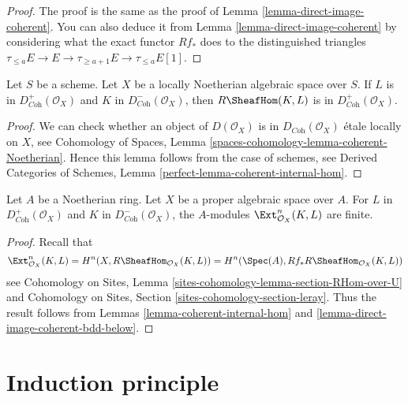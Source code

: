 \begin{proof}
The proof is the same as the proof of
Lemma \ref{lemma-direct-image-coherent}.
You can also deduce it from
Lemma \ref{lemma-direct-image-coherent}
by considering what the exact functor $Rf_*$ does to
the distinguished triangles
$\tau_{\leq a}E \to E \to \tau_{\geq a + 1}E \to \tau_{\leq a}E[1]$.
\end{proof}

\begin{lemma}
\label{lemma-coherent-internal-hom}
Let $S$ be a scheme. Let $X$ be a locally Noetherian algebraic space over $S$.
If $L$ is in $D^+_{\textit{Coh}}(\mathcal{O}_X)$
and $K$ in $D^-_{\textit{Coh}}(\mathcal{O}_X)$, then
$R\SheafHom(K, L)$ is in $D^+_{\textit{Coh}}(\mathcal{O}_X)$.
\end{lemma}

\begin{proof}
We can check whether an object of $D(\mathcal{O}_X)$ is in
$D_{\textit{Coh}}(\mathcal{O}_X)$ \'etale locally on $X$, see
Cohomology of Spaces, Lemma \ref{spaces-cohomology-lemma-coherent-Noetherian}.
Hence this lemma follows from the case of schemes, see
Derived Categories of Schemes, Lemma \ref{perfect-lemma-coherent-internal-hom}.
\end{proof}

\begin{lemma}
\label{lemma-ext-finite}
Let $A$ be a Noetherian ring. Let $X$ be a proper algebraic space over $A$.
For $L$ in $D^+_{\textit{Coh}}(\mathcal{O}_X)$ and $K$ in
$D^-_{\textit{Coh}}(\mathcal{O}_X)$, the $A$-modules
$\Ext_{\mathcal{O}_X}^n(K, L)$ are finite.
\end{lemma}

\begin{proof}
Recall that
$$
\Ext_{\mathcal{O}_X}^n(K, L) =
H^n(X, R\SheafHom_{\mathcal{O}_X}(K, L)) =
H^n(\Spec(A), Rf_*R\SheafHom_{\mathcal{O}_X}(K, L))
$$
see Cohomology on Sites, Lemma \ref{sites-cohomology-lemma-section-RHom-over-U}
and Cohomology on Sites, Section \ref{sites-cohomology-section-leray}.
Thus the result follows from
Lemmas \ref{lemma-coherent-internal-hom} and
\ref{lemma-direct-image-coherent-bdd-below}.
\end{proof}




\section{Induction principle}
\label{section-induction}

